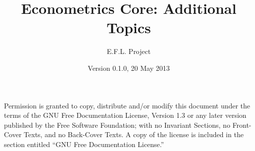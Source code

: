 \documentclass[nofonts]{tufte-latex/tufte-handout}
\title{Econometrics Core: Additional Topics}
\author{E.F.L. Project}
\date{Version 0.1.0, 20 May 2013}
\begin{document}
\maketitle
\tableofcontents

  Permission is granted to
copy, distribute and/or modify this document under the terms of the
GNU Free Documentation License, Version 1.3 or any later version
published by the Free Software Foundation; with no Invariant Sections,
no Front-Cover Texts, and no Back-Cover Texts.  A copy of the license
is included in the section entitled ``GNU Free Documentation
License.''





\appendix

\end{document}
